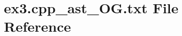 \hypertarget{ex3_8cpp__ast__OG_8txt}{}\section{ex3.\+cpp\+\_\+ast\+\_\+\+O\+G.\+txt File Reference}
\label{ex3_8cpp__ast__OG_8txt}
